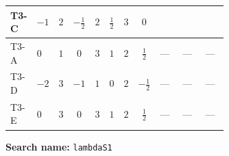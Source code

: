\documentclass[8pt]{article}
\begin{document}
\begin{landscape}
\begin{longtable}{@{}llcccccc >{\raggedright\arraybackslash}p{0.21\linewidth} >{\raggedright\arraybackslash}p{0.21\linewidth} >{\raggedright\arraybackslash}p{0.21\linewidth}@{}}
\midrule
T3-C & $-1$ & $2$ & $-\frac{1}{2}$ & $2$ & $\frac{1}{2}$ & $3$ & $0$ & \scriptsize\adjustbox{max width=\linewidth}{$\begin{gathered} 8 {\lambda_{H^\dagger H^\dagger S_1^\dagger S_1^\dagger}} \left({\lambda_{H^\dagger H^\dagger S_1^\dagger S_1^\dagger}}\right)^{*}\end{gathered}$} & \scriptsize\adjustbox{max width=\linewidth}{$\begin{gathered} +8 {\lambda_{S_1^{\dagger 2}S_2^{\dagger 2}}} \left({\lambda_{S_1^{\dagger 2}S_2^{\dagger 2}}}\right)^{*}\end{gathered}$} & \scriptsize\adjustbox{max width=\linewidth}{$\begin{gathered} +24 {\lambda_{S_1 S_1^{\dagger 2}S_2^\dagger}} \left({\lambda_{S_1 S_1^{\dagger 2}S_2^\dagger}}\right)^{*}\end{gathered}$} \\
\midrule
T3-A & $0$ & $1$ & $0$ & $3$ & $1$ & $2$ & $\frac{1}{2}$ & --- & --- & --- \\
\midrule
T3-D & $-2$ & $3$ & $-1$ & $1$ & $0$ & $2$ & $-\frac{1}{2}$ & --- & --- & --- \\
\midrule
T3-E & $0$ & $3$ & $0$ & $3$ & $1$ & $2$ & $\frac{1}{2}$ & --- & --- & --- \\
\midrule
\bottomrule
\end{longtable}
\clearpage
\noindent\textbf{Search name: }\texttt{lambdaS1}\par\smallskip

\end{landscape}
\end{document}
